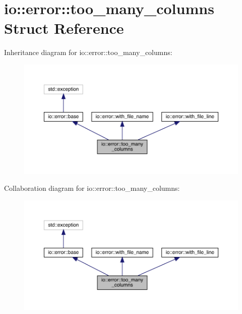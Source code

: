 \hypertarget{structio_1_1error_1_1too__many__columns}{}\section{io\+:\+:error\+:\+:too\+\_\+many\+\_\+columns Struct Reference}
\label{structio_1_1error_1_1too__many__columns}


Inheritance diagram for io\+:\+:error\+:\+:too\+\_\+many\+\_\+columns\+:
\nopagebreak
\begin{figure}[H]
\begin{center}
\leavevmode
\includegraphics[width=350pt]{structio_1_1error_1_1too__many__columns__inherit__graph}
\end{center}
\end{figure}


Collaboration diagram for io\+:\+:error\+:\+:too\+\_\+many\+\_\+columns\+:
\nopagebreak
\begin{figure}[H]
\begin{center}
\leavevmode
\includegraphics[width=350pt]{structio_1_1error_1_1too__many__columns__coll__graph}
\end{center}
\end{figure}
